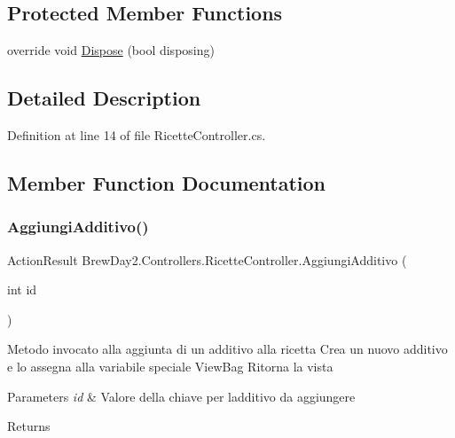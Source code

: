 \subsection*{Protected Member Functions}
\begin{DoxyCompactItemize}
\item 
override void \mbox{\hyperlink{class_brew_day2_1_1_controllers_1_1_ricette_controller_afde9e7996a273f2d266002af7ca6caa7}{Dispose}} (bool disposing)
\end{DoxyCompactItemize}


\subsection{Detailed Description}


Definition at line 14 of file Ricette\+Controller.\+cs.



\subsection{Member Function Documentation}
\mbox{\label{class_brew_day2_1_1_controllers_1_1_ricette_controller_a8f87299b4d88f8549bf9f7f1f7b87cac}} 
\subsubsection{\texorpdfstring{Aggiungi\+Additivo()}{AggiungiAdditivo()}\hspace{0.1cm}{\footnotesize\ttfamily [1/2]}}
{\footnotesize\ttfamily Action\+Result Brew\+Day2.\+Controllers.\+Ricette\+Controller.\+Aggiungi\+Additivo (\begin{DoxyParamCaption}\item[{int}]{id }\end{DoxyParamCaption})}



Metodo invocato alla aggiunta di un additivo alla ricetta Crea un nuovo additivo e lo assegna alla variabile speciale View\+Bag Ritorna la vista 


\begin{DoxyParams}{Parameters}
{\em id} & Valore della chiave per l\textquotesingle{}additivo da aggiungere\\
\hline
\end{DoxyParams}
\begin{DoxyReturn}{Returns}

\end{DoxyReturn}


